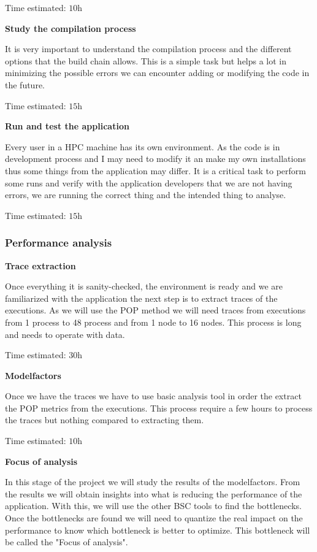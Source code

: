 Time estimated: $\si{10\hour}$

\textbf{Study the compilation process}

It is very important to understand the compilation process and the different options that the build chain allows. This is a simple task but helps a lot in minimizing the possible errors we can encounter adding or modifying the code in the future.

Time estimated: $\si{15\hour}$

\textbf{Run and test the application}

Every user in a HPC machine has its own environment. As the code is in development process and I may need to modify it an make my own installations thus some things from the application may differ. It is a critical task to perform some runs and verify with the application developers that we are not having errors, we are running the correct thing and the intended thing to analyse.  

Time estimated: $\si{15\hour}$

\subsubsection{Performance analysis}

\textbf{Trace extraction}

Once everything it is sanity-checked, the environment is ready and we are familiarized with the application the next step is to extract traces of the executions. As we will use the POP method we will need traces from executions from 1 process to 48 process and from 1 node to 16 nodes. This process is long and needs to operate with data.

Time estimated: $\si{30\hour}$

\textbf{Modelfactors}

Once we have the traces we have to use basic analysis tool in order the extract the POP metrics from the executions. This process require a few hours to process the traces but nothing compared to extracting them.

Time estimated: $\si{10\hour}$

\textbf{Focus of analysis}

In this stage of the project we will study the results of the modelfactors. From the results we will obtain insights into what is reducing the performance of the application. With this, we will use the other BSC tools to find the bottlenecks. Once the bottlenecks are found we will need to quantize the real impact on the performance to know which bottleneck is better to optimize. This bottleneck will be called the "Focus of analysis".

